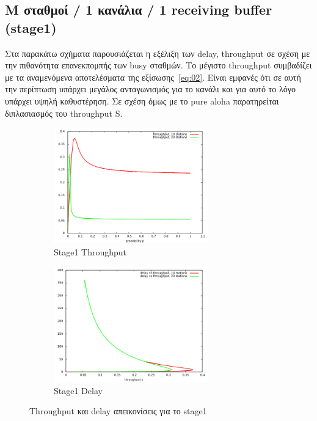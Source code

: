\documentclass[12pt]{report}
\begin{document}
\subsection{\textlatin{M} σταθμοί / 1 κανάλια / 1 \textlatin{receiving buffer} (\textlatin{stage1})}
Στα παρακάτω σχήματα παρουσιάζεται η εξέλιξη των \textlatin{delay, throughput} σε σχέση με την πιθανότητα επανεκπομπής των \textlatin{busy} σταθμών. Το μέγιστο \textlatin{throughput} συμβαδίζει με τα αναμενόμενα αποτελέσματα της εξίσωσης~\ref{eq:02}. Είναι εμφανές ότι σε αυτή την περίπτωση υπάρχει μεγάλος ανταγωνισμός για το κανάλι και για αυτό το λόγο υπάρχει υψηλή καθυστέρηση. Σε σχέση όμως με το \textlatin{pure aloha} παρατηρείται διπλασιασμός του \textlatin{throughput S}.
\begin{figure}[h]
\begin{subfigure}{0.5\textwidth}
\includegraphics[width=0.9\linewidth, height=5cm]{st1_throughput} 
\caption{\textlatin{Stage1 Throughput}}
\label{fig:st1_throughput}
\end{subfigure}
\begin{subfigure}{0.5\textwidth}
\includegraphics[width=0.9\linewidth, height=5cm]{st1_delay}
\caption{\textlatin{Stage1 Delay}}
\label{fig:st1_delay}
\end{subfigure}
 
\caption{\textlatin{Throughput} και \textlatin{delay} απεικονίσεις για το \textlatin{stage1}}
\label{fig:Stage1}
\end{figure}
\end{document}

